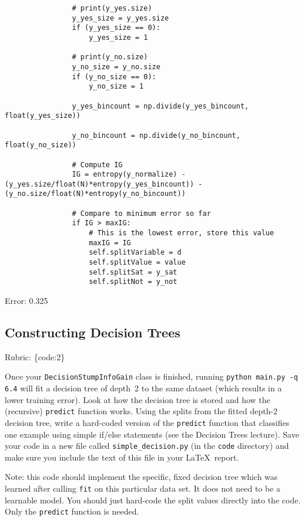 \documentclass{article}
\def\rubric#1{\gre{Rubric: \{#1\}}}{}
\def\blu#1{{\color{blu}#1}}
\def\gre#1{{\color{gre}#1}}
\def\red#1{{\color{red}#1}}
\begin{document}
\begin{lstlisting}
                # print(y_yes.size)
                y_yes_size = y_yes.size
                if (y_yes_size == 0):
                    y_yes_size = 1
            
                # print(y_no.size)
                y_no_size = y_no.size
                if (y_no_size == 0):
                    y_no_size = 1

                y_yes_bincount = np.divide(y_yes_bincount, float(y_yes_size))
                
                y_no_bincount = np.divide(y_no_bincount, float(y_no_size))

                # Compute IG
                IG = entropy(y_normalize) - (y_yes.size/float(N)*entropy(y_yes_bincount)) - (y_no.size/float(N)*entropy(y_no_bincount))

                # Compare to minimum error so far
                if IG > maxIG:
                    # This is the lowest error, store this value
                    maxIG = IG
                    self.splitVariable = d
                    self.splitValue = value
                    self.splitSat = y_sat
                    self.splitNot = y_not

\end{lstlisting}
\red{Error: 0.325}
\subsection{Constructing Decision Trees}
\rubric{code:2}

Once your \texttt{DecisionStumpInfoGain} class is finished, running \texttt{python main.py -q 6.4} will fit
a decision tree of depth~2 to the same dataset (which results in a lower training error).
Look at how the decision tree is stored and how the (recursive) \texttt{predict} function works.
\blu{Using the splits from the fitted depth-2 decision tree, write a hard-coded version of the \texttt{predict}
function that classifies one example using simple if/else statements
(see the Decision Trees lecture).} Save your code in a new file called
\texttt{simple\string_decision.py} (in the \texttt{code} directory) and make sure you include the text of this file in your \LaTeX \, report.

Note: this code should implement the specific, fixed decision tree
which was learned after calling \texttt{fit} on this particular data set. It does not need to be a learnable model.
You should just hard-code the split values directly into the code. Only the \texttt{predict} function is needed.
\end{document}
